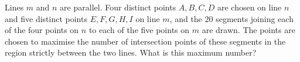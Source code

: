 Lines $m$ and $n$ are parallel. Four distinct points $A,B,C,D$ are chosen on line $n$ and five distinct points $E,F,G,H,I$ on line $m$, and the $20$ segments joining each of the four points on $n$ to each of the five points on $m$ are drawn. The points are chosen to maximise the number of intersection points of these segments in the region strictly between the two lines. What is this maximum number?
